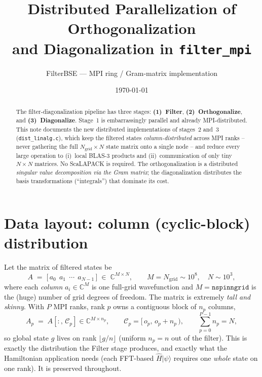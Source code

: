 \documentclass[11pt]{article}
\title{\vspace{-1.2cm}\bfseries Distributed Parallelization of Orthogonalization\\ and Diagonalization in \texttt{filter\_mpi}}
\author{FilterBSE --- MPI ring / Gram-matrix implementation}
\date{\today}
\newcommand{\Ngrid}{N_{\mathrm{grid}}}
\begin{document}
\maketitle
\vspace{-0.6cm}

\begin{abstract}
\noindent
The filter-diagonalization pipeline has three stages: \textbf{(1)~Filter},
\textbf{(2)~Orthogonalize}, and \textbf{(3)~Diagonalize}. Stage~1 is
embarrassingly parallel and already MPI-distributed. This note documents the
new distributed implementations of stages~2 and~3 (\texttt{dist\_linalg.c}),
which keep the filtered states \emph{column-distributed} across MPI ranks --
never gathering the full $\Ngrid\!\times\!N$ state matrix onto a single node --
and reduce every large operation to (i)~local BLAS-3 products and
(ii)~communication of only tiny $N\!\times\!N$ matrices. No ScaLAPACK is
required. The orthogonalization is a distributed \emph{singular value
decomposition via the Gram matrix}; the diagonalization distributes the basis
transformations (``integrals'') that dominate its cost.
\end{abstract}

\section{Data layout: column (cyclic-block) distribution}

Let the matrix of filtered states be
\[
  A \;=\; \big[\,a_0\ \ a_1\ \ \cdots\ \ a_{N-1}\,\big]\;\in\;\mathbb{C}^{M\times N},
  \qquad M=\Ngrid \sim 10^{8},\quad N \sim 10^{3},
\]
where each \emph{column} $a_i\in\mathbb{C}^{M}$ is one full-grid wavefunction and
$M = \texttt{nspinngrid}$ is the (huge) number of grid degrees of freedom. The
matrix is extremely \emph{tall and skinny}. With $P$ MPI ranks, rank $p$ owns a
contiguous block of $n_p$ columns,
\[
  A_p \;=\; A[:,\,\mathcal{C}_p]\in\mathbb{C}^{M\times n_p},\qquad
  \mathcal{C}_p=[\,o_p,\,o_p+n_p\,),\qquad \sum_{p=0}^{P-1} n_p = N,
\]
so global state $g$ lives on rank $\lfloor g/n\rfloor$ (uniform $n_p=n$ out of
the filter). This is exactly the distribution the Filter stage produces, and
exactly what the Hamiltonian application needs (each FFT-based $\hat H|\psi\rangle$
requires one \emph{whole} state on one rank). It is preserved throughout.
\end{document}
